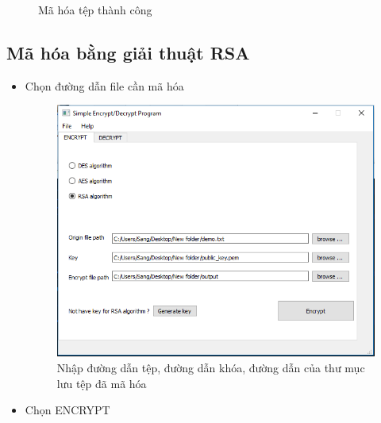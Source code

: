 \documentclass[a4paper]{article}
\begin{document}
\begin{itemize}
\begin{center}
\begin{figure}[H]
\begin{center}
    \end{center}
    \caption{Mã hóa tệp thành công}
    \label{refhinh5}
    \end{figure}
\end{center}
\end{itemize}

\subsection{Mã hóa bằng giải thuật RSA}
\begin{itemize}
	
    \item
    Chọn đường dẫn file cần mã hóa
    \begin{center}
    \begin{figure}[H]
    \begin{center}
     \includegraphics[scale=.5]{hinh/rsa-1}
    \end{center}
    \caption{Nhập đường dẫn tệp, đường dẫn khóa, đường dẫn của thư mục lưu tệp đã mã hóa}
    \label{refhinh6}
    \end{figure}
	\end{center}
	\item
	Chọn ENCRYPT
	\begin{center}
    \begin{figure}[H]
    \begin{center}

\end{center}
\end{figure}
\end{center}
\end{itemize}
\end{document}

